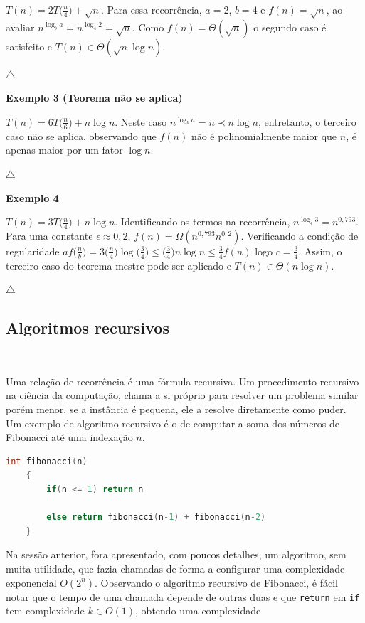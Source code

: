 $T(n) = 2T\Bigr(\frac{n}{4}\Bigr) + \sqrt{n}$. Para essa recorrência, $a = 2$, $b = 4$ e $f(n) = \sqrt{n}$, ao avaliar $n^{\log_ba}=n^{\log_4 2} = \sqrt{n}$. Como $f(n) = \Theta(\sqrt{n})$ o segundo caso é satisfeito e $T(n) \in \Theta(\sqrt{n}\log n)$.

{\raggedleft $\bigtriangleup$ \par}

\textbf{Exemplo 3 (Teorema não se aplica)}

$T(n) = 6T\Bigr(\frac{n}{6}\Bigr) + {n \log n}$. Neste caso $n^{\log_ba} = n \prec n \log n$, entretanto, o terceiro caso não se aplica, observando que $f(n)$ não é polinomialmente maior que $n$, é apenas maior por um fator $\log n$.

{\raggedleft $\bigtriangleup$ \par}

\textbf{Exemplo 4}

$T(n) = 3T\Bigr(\frac{n}{4}\Bigr) + {n \log n}$. Identificando os termos na recorrência, $n^{\log_4 3} = n^{0,793}$. Para uma constante $\epsilon \approx 0,2$, $f(n) = \Omega(n^{0,793}n^{0,2})$. Verificando a condição de regularidade $af\Bigr(\frac{n}{b}\Bigr) = 3\Bigr(\frac{n}{4}\Bigr)\log\Bigr(\frac{3}{4}\Bigr) \leq \Bigr(\frac{3}{4}\Bigr) n \log n \leq \frac{3}{4}f(n)$ logo $c=\frac{3}{4}$. Assim, o terceiro caso do teorema mestre pode ser aplicado e $T(n) \in \Theta (n \log n)$.

{\raggedleft $\bigtriangleup$ \par}

\subsection{Algoritmos recursivos}
\

Uma relação de recorrência é uma fórmula recursiva. Um procedimento recursivo na ciência da computação, chama a si próprio para resolver um problema similar porém menor, se a instância é pequena, ele a resolve diretamente como puder. Um exemplo de algoritmo recursivo é o de computar a soma dos números de Fibonacci até uma indexação $n$.

\begin{lstlisting}[language=C, frame=single]
    int fibonacci(n)
    {
        if(n <= 1) return n

        else return fibonacci(n-1) + fibonacci(n-2)
    }
\end{lstlisting}

Na sessão anterior, fora apresentado, com poucos detalhes, um algoritmo, sem muita utilidade, que fazia chamadas de forma a configurar uma complexidade exponencial $O(2^n)$. Observando o algoritmo recursivo de Fibonacci, é fácil notar que o tempo de uma chamada depende de outras duas e que \texttt{return} em \texttt{if} tem complexidade $k \in O(1)$, obtendo uma complexidade

